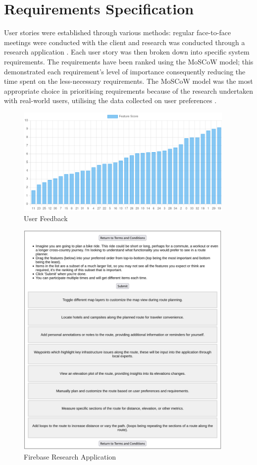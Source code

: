 \section{Requirements Specification}
\label{requirements:specification}

User stories were established through various methods: regular face-to-face meetings were conducted with the client  and research was conducted through a research application . Each user story was then broken down into specific system requirements. The requirements have been ranked using the MoSCoW model; this demonstrated each requirement's level of importance consequently reducing the time spent on the less-necessary requirements. The MoSCoW model was the most appropriate choice in prioritising requirements because of the research undertaken with real-world users, utilising the data collected on user preferences .

\begin{figure}[!h]
  \centering
  \includegraphics[width=400px]{figures/logarithmic-scoring.png}
  \caption{User Feedback}
  \label{fig:userfeedback01}
\end{figure}

\begin{figure}
  \centering
  \includegraphics[width=400px]{figures/research-application.png}
  \caption{Firebase Research Application}
  \label{fig:researchapp}
\end{figure}


